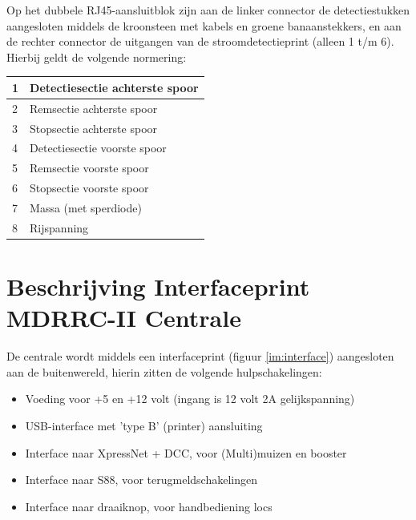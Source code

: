 \documentclass[12pt,a4paper]{report}
\begin{document}
Op het dubbele RJ45-aansluitblok zijn aan de linker connector de detectiestukken aangesloten middels de kroonsteen met kabels en groene banaanstekkers, en aan de rechter connector de uitgangen van de stroomdetectieprint (alleen 1 t/m 6). Hierbij geldt de volgende normering:\\

\begin{tabular}{|l|p{10cm}|}
\hline
1&Detectiesectie achterste spoor\\
\hline
2&Remsectie achterste spoor\\
\hline
3&Stopsectie achterste spoor\\
\hline
4&Detectiesectie voorste spoor\\
\hline
5&Remsectie voorste spoor\\
\hline
6&Stopsectie voorste spoor\\
\hline
7&Massa (met sperdiode)\\
\hline
8&Rijspanning\\
\hline
\end{tabular}

\chapter{Beschrijving Interfaceprint MDRRC-II Centrale}
\label{ch:centrale}

De centrale wordt middels een interfaceprint (figuur \ref{im:interface}) aangesloten aan de buitenwereld, hierin zitten de volgende hulpschakelingen:

\begin{itemize}
\item Voeding voor +5 en +12 volt (ingang is 12 volt 2A gelijkspanning)
\item USB-interface met 'type B' (printer) aansluiting
\item Interface naar XpressNet + DCC, voor (Multi)muizen en booster
\item Interface naar S88, voor terugmeldschakelingen
\item Interface naar draaiknop, voor handbediening locs
\end{itemize}
\end{document}
